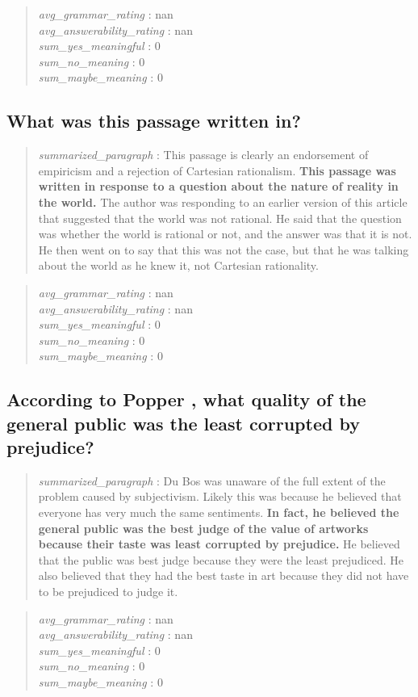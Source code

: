 \begin{quote}
\emph{avg\_grammar\_rating} : nan\\
\emph{avg\_answerability\_rating} : nan\\
\emph{sum\_yes\_meaningful} : 0\\
\emph{sum\_no\_meaning} : 0\\
\emph{sum\_maybe\_meaning} : 0
\end{quote}

\hypertarget{what-was-this-passage-written-in}{%
\subsection{What was this passage written
in?}\label{what-was-this-passage-written-in}}

\begin{quote}
\emph{summarized\_paragraph} : This passage is clearly an endorsement of
empiricism and a rejection of Cartesian rationalism. \textbf{This
passage was written in response to a question about the nature of
reality in the world.} The author was responding to an earlier version
of this article that suggested that the world was not rational. He said
that the question was whether the world is rational or not, and the
answer was that it is not. He then went on to say that this was not the
case, but that he was talking about the world as he knew it, not
Cartesian rationality.
\end{quote}

\begin{quote}
\emph{avg\_grammar\_rating} : nan\\
\emph{avg\_answerability\_rating} : nan\\
\emph{sum\_yes\_meaningful} : 0\\
\emph{sum\_no\_meaning} : 0\\
\emph{sum\_maybe\_meaning} : 0
\end{quote}

\hypertarget{according-to-popper-what-quality-of-the-general-public-was-the-least-corrupted-by-prejudice}{%
\subsection{According to Popper , what quality of the general public was
the least corrupted by
prejudice?}\label{according-to-popper-what-quality-of-the-general-public-was-the-least-corrupted-by-prejudice}}

\begin{quote}
\emph{summarized\_paragraph} : Du Bos was unaware of the full extent of
the problem caused by subjectivism. Likely this was because he believed
that everyone has very much the same sentiments. \textbf{In fact, he
believed the general public was the best judge of the value of artworks
because their taste was least corrupted by prejudice.} He believed that
the public was best judge because they were the least prejudiced. He
also believed that they had the best taste in art because they did not
have to be prejudiced to judge it.
\end{quote}

\begin{quote}
\emph{avg\_grammar\_rating} : nan\\
\emph{avg\_answerability\_rating} : nan\\
\emph{sum\_yes\_meaningful} : 0\\
\emph{sum\_no\_meaning} : 0\\
\emph{sum\_maybe\_meaning} : 0
\end{quote}

